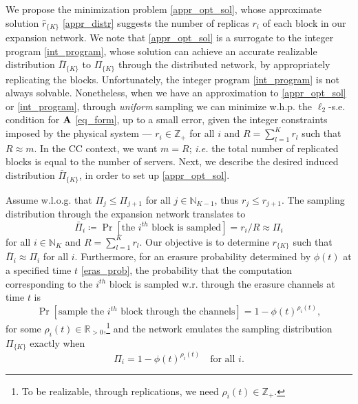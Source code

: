 \documentclass[journal,letterpaper,onecolumn,twoside,nofonttune]{IEEEtran}
\newcommand{\N}{\mathbb{N}}
\newcommand{\Z}{\mathbb{Z}}
\newcommand{\R}{\mathbb{R}}
\newcommand{\Ub}{\bold{U}}
\newcommand{\Ab}{\bold{A}}
\newcommand{\Ib}{\bold{I}}
\newcommand{\Sb}{\bold{S}}
\newcommand{\Sbwt}{\widetilde{\Sb}}
\newcommand{\rh}{\hat{r}}
\newcommand{\Pib}{\bar{\Pi}}
\newcommand{\Ft}{\tilde{F}}
\begin{document}
We propose the minimization problem \eqref{appr_opt_sol}, whose approximate solution $\rh_{\{K\}}$ \eqref{appr_distr} suggests the number of replicas $r_i$ of each block in our expansion network. We note that \eqref{appr_opt_sol} is a surrogate to the integer program \eqref{int_program}, whose solution can achieve an accurate realizable distribution $\Pib_{\{K\}}$ to $\Pi_{\{K\}}$ through the distributed network, by appropriately replicating the blocks. Unfortunately, the integer program \eqref{int_program} is not always solvable. Nonetheless, when we have an approximation to \eqref{appr_opt_sol} or \eqref{int_program}, through \textit{uniform} sampling we can minimize w.h.p. the $\ell_2$-s.e. condition for $\Ab$ \eqref{eq_form}, up to a small error, given the integer constraints imposed by the physical system --- $r_i\in\Z_+$ for all $i$ and $R=\sum_{l=1}^Kr_l$ such that $R\approx m$. In the CC context, we want $m=R$; \textit{i.e.} the total number of replicated blocks is equal to the number of servers. Next, we describe the desired induced distribution $\Pib_{\{K\}}$, in order to set up \eqref{appr_opt_sol}.%

Assume w.l.o.g. that $\Pi_j\leqslant\Pi_{j+1}$ for all $j\in\N_{K-1}$, thus $r_j\leqslant r_{j+1}$. The sampling distribution through the expansion network translates to
\begin{equation}
\label{exp_netw_distr}
  \Pib_i \coloneqq \Pr\left[\text{the } i^{th} \text{ block is sampled}\right] = r_i/R \approx \Pi_i
\end{equation}
for all $i\in\N_K$ and $R=\sum_{l=1}^Kr_l$. Our objective is to determine $r_{\{K\}}$ such that $\Pib_i\approx\Pi_i$ for all $i$. Furthermore, for an erasure probability determined by $\phi(t)$ at a specified time $t$ \eqref{eras_prob}, the probability that the computation corresponding to the $i^{th}$ block is sampled w.r. through the erasure channels at time $t$ is
\begin{equation}
\label{sample_er_channel}
  \Pr\left[\text{sample the } i^{th} \text{ block through the channels}\right]=1-\phi(t)^{\rho_i(t)},
\end{equation}
for some $\rho_i(t)\in\R_{>0}$,\footnote{To be realizable, through replications, we need $\rho_i(t)\in\Z_+$.} and the network emulates the sampling distribution $\Pi_{\{K\}}$ exactly when
\begin{equation}
\label{lvg_score_eras_prob}
  \Pi_i=1-\phi(t)^{\rho_i(t)} \quad \text{for all } i.
\end{equation}
\end{document}
